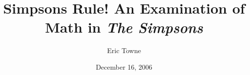 \documentclass[12pt,oneside]{amsbook}
\numberwithin{equation}{chapter}
\numberwithin{figure}{chapter}
\theoremstyle{plain} %
\theoremstyle{definition}
\theoremstyle{remark}
\begin{document}
\frontmatter %
\title[]{Simpsons Rule! An Examination of Math in \emph{The Simpsons} }
\author{Eric Towne}
\address{Department of Mathematics\\Bates College\\Lewiston, ME 04240}
\date{December 16, 2006}
\maketitle

\newpage
\thispagestyle{empty} 			%
\setcounter{page}{2}

\tableofcontents



\mainmatter %

\setcounter{pnumb}{\value{page}}       	%
\mainmatter                            	%
\setcounter{page}{\value{pnumb}}       	%



\backmatter

\end{document}
